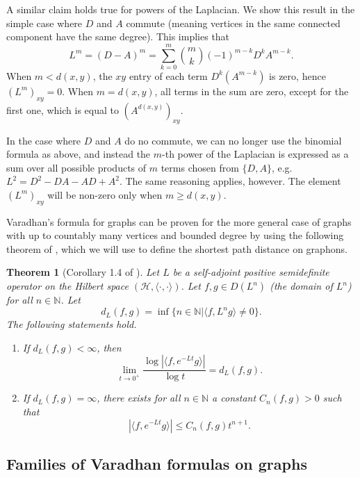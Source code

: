 \documentclass[11pt]{article}
\def\N{\mathbb{N}}
\def\log{\operatorname{log}}
\newtheorem{theorem}{Theorem}[section]
\theoremstyle{definition}
\begin{document}
A similar claim holds true for powers of the Laplacian. We show this result in the simple case where $D$ and $A$ commute (meaning vertices in the same connected component have the same degree). This implies that
$$ L^m = (D-A)^m = \sum_{k=0}^m \binom{m}{k} (-1)^{m-k} D^k A^{m-k}. $$
When $m < d(x,y)$, the $xy$ entry of each term $D^k (A^{m-k})$ is zero, hence $(L^m)_{xy} = 0$. When $m = d(x,y)$, all terms in the sum are zero, except for the first one, which is equal to $(A^{d(x,y)})_{xy}$.

In the case where $D$ and $A$ do no commute, we can no longer use the binomial formula as above, and instead the $m$-th power of the Laplacian is expressed as a sum over all possible products of $m$ terms chosen from $\{D,A\}$, e.g. $L^2 = D^2 - DA - AD + A^2$. The same reasoning applies, however. The element $(L^m)_{xy}$ will be non-zero only when $m\ge d(x,y)$.

Varadhan's formula for graphs can be proven for the more general case of graphs with up to countably many vertices and bounded degree by using the following theorem of \cite{kellerNoteShorttimeBehavior2016}, which we will use to define the shortest path distance on graphons.

\begin{theorem}[Corollary 1.4 of \cite{kellerNoteShorttimeBehavior2016}] \label{thm:keller}
    Let $L$ be a self-adjoint positive semidefinite operator on the Hilbert space $(\mathcal{H},\langle \cdot,\cdot\rangle)$. Let $f,g \in D(L^n)$ (the domain of $L^n$) for all $n\in \N$. Let
    $$ d_L (f,g) = \inf \{n \in \N | \langle f,L^n g\rangle \neq 0\}. $$
    The following statements hold.
    \begin{enumerate}
        \item If $d_L(f,g) < \infty$, then
        $$ \lim_{t\rightarrow 0^+} \frac{\log |\langle f, e^{-Lt}g \rangle|}{\log t} = d_L (f,g). $$
        \item If $d_L (f,g) = \infty$, there exists for all $n\in\N$ a constant $C_n(f,g) >0$ such that
        $$ |\langle f, e^{-Lt}g\rangle | \le C_n (f,g) t^{n+1}. $$
    \end{enumerate}
\end{theorem}

\subsection{Families of Varadhan formulas on graphs} \label{sec:other-odes}
\end{document}

